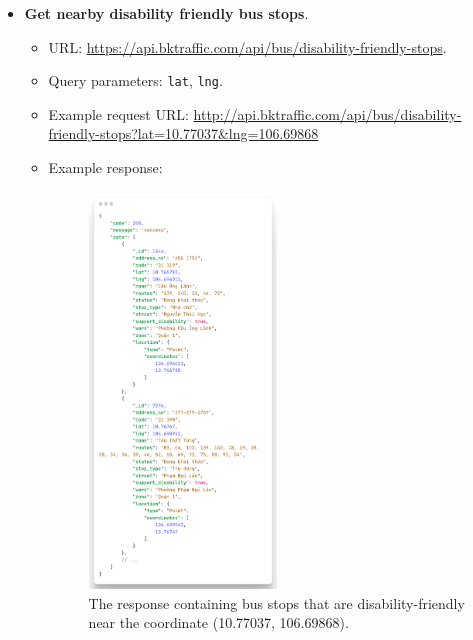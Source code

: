 \begin{itemize}
    \item \textbf{Get nearby disability friendly bus stops}.
    \begin{itemize}
        \item URL: \url{https://api.bktraffic.com/api/bus/disability-friendly-stops}.
        \item Query parameters: \lstinline{lat}, \lstinline{lng}.
        \item Example request URL: \url{http://api.bktraffic.com/api/bus/disability-friendly-stops?lat=10.77037&lng=106.69868}
        \item Example response:
        \begin{figure}[H]
            \centering
            \includegraphics[width=0.5\textwidth]{assets/images/Implementation/nearby_disable_response.png}
            \caption{The response containing bus stops that are disability-friendly near the coordinate (10.77037, 106.69868).}
            \label{fig:nearby_disable_response}
        \end{figure}
    \end{itemize}


\end{itemize}

